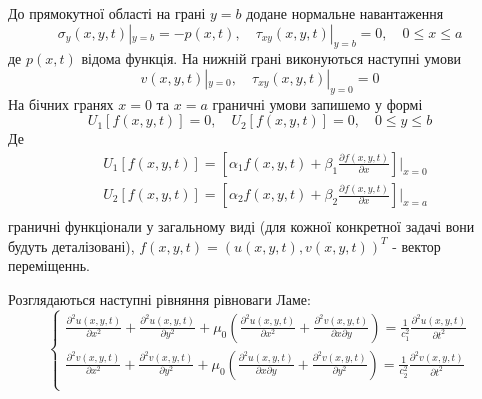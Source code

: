 До прямокутної області на грані $y=b$ додане нормальне навантаження
\begin{equation}
    \sigma_y(x, y, t) |_{y=b} = -p(x, t), \quad  \tau_{xy}(x,y,t) |_{y=b} =0, \quad 0 \le x \le a
\end{equation}
де $p(x, t)$ відома функція.
На нижній грані виконуються наступні умови
\begin{equation}
    v(x,y,t) |_{y=0}, \quad \tau_{xy}(x,y,t) |_{y=0} =0
\end{equation}
На бічних гранях $x=0$ та $x=a$ граничні умови запишемо у формі
\begin{equation}\label{gen_bound_gen}
    U_1[f(x,y,t)]=0, \quad U_2[f(x,y,t)]=0 , \quad 0 \le y \le b
\end{equation}
Де 
\begin{align*}
    &U_1[f(x,y,t)]=\left[\alpha_1f(x,y,t) + \beta_1 \frac{\partial f(x,y,t)}{\partial x} \right]|_{x=0} \\
    &U_2[f(x,y,t)]=\left[\alpha_2f(x,y,t) + \beta_2 \frac{\partial f(x,y,t)}{\partial x} \right]|_{x=a} \\
\end{align*}
граничні функціонали у загальному виді (для кожної конкретної задачі вони будуть деталізовані), $f(x,y,t)=(u(x,y,t), v(x,y,t))^T$ - вектор переміщеннь.

Розглядаються наступні рівняння рівноваги Ламе:
\begin{equation}
    \begin{cases}
        \frac{\partial^2 u(x,y,t)}{\partial x^2} + \frac{\partial^2 u(x,y,t)}{\partial y^2} + \mu_0 (\frac{\partial^2 u(x,y,t)}{\partial x^2} + \frac{\partial^2 v(x,y,t)}{\partial x\partial y}) = \frac{1}{c_1^2} \frac{\partial^2 u(x,y,t)}{\partial t^2} \\
        \frac{\partial^2 v(x,y,t)}{\partial x^2} + \frac{\partial^2 v(x,y,t)}{\partial y^2} + \mu_0 (\frac{\partial^2 u(x,y,t)}{\partial x \partial y} + \frac{\partial^2 v(x,y,t)}{\partial y^2}) = \frac{1}{c_2^2} \frac{\partial^2 v(x,y,t)}{\partial t^2} \\
    \end{cases}
\end{equation}

